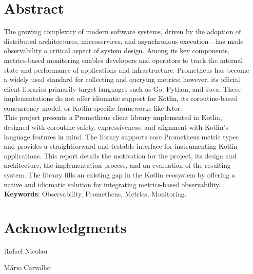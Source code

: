 \documentclass[a4paper,openright,twoside,11pt]{report}
\begin{document}
    \chapter*{Abstract}
    The growing complexity of modern software systems, driven by the adoption of distributed architectures,
    microservices, and asynchronous execution—has made observability a critical aspect of system design.
    Among its key components, metrics-based monitoring enables developers and operators to track the internal state and performance of applications and infrastructure.
    Prometheus has become a widely used standard for collecting and querying metrics; however, its official client libraries primarily target languages such as Go, Python, and Java.
    These implementations do not offer idiomatic support for Kotlin, its coroutine-based concurrency model, or
    Kotlin-specific frameworks like Ktor.\\

    This project presents a Prometheus client library implemented in Kotlin, designed with coroutine safety, expressiveness, and alignment with Kotlin's language features in mind.
    The library supports core Prometheus metric types and provides a straightforward and testable interface for instrumenting Kotlin applications.
    This report details the motivation for the project, its design and architecture, the implementation process, and an evaluation of the resulting system.
    The library fills an existing gap in the Kotlin ecosystem by offering a native and idiomatic solution for
    integrating metrics-based observability.\\

    {\textbf{Keywords}: Observability, Prometheus, Metrics, Monitoring.}

    \cleardoublepage
    \chapter*{Acknowledgments}
    \lipsum[1]
    \vspace{2em}
    \begin{flushright}
        Rafael Nicolau
    \end{flushright}

    \lipsum[1]
    \vspace{2em}
    \begin{flushright}
        Mário Carvalho
    \end{flushright}

    \cleardoublepage
    \tableofcontents \cleardoublepage
\end{document}
